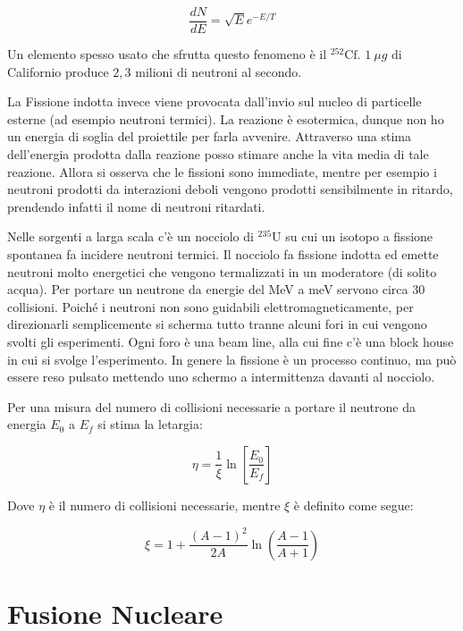 \documentclass [a4paper, twoside] {book}
\begin{document}
\begin{equation}
\frac{dN}{dE}=\sqrt{E}e^{-E/T}
\end{equation}

Un elemento spesso usato che sfrutta questo fenomeno è il $^{252}\text{Cf}$. $1 \ \mu g$ di Californio produce $2,3$ milioni di neutroni al secondo.

La Fissione indotta invece viene provocata dall'invio sul nucleo di particelle esterne (ad esempio neutroni termici). La reazione è esotermica, dunque non ho un energia di soglia del proiettile per farla avvenire. Attraverso una stima dell'energia prodotta dalla reazione posso stimare anche la vita media di tale reazione. Allora si osserva che le fissioni sono immediate, mentre per esempio i neutroni prodotti da interazioni deboli vengono prodotti sensibilmente in ritardo, prendendo infatti il nome di neutroni ritardati.

Nelle sorgenti a larga scala c'è un nocciolo di $^{235}\text{U}$ su cui un isotopo a fissione spontanea fa incidere neutroni termici. Il nocciolo fa fissione indotta ed emette neutroni molto energetici che vengono termalizzati in un moderatore (di solito acqua). Per portare un neutrone da energie del MeV a meV servono circa 30 collisioni. Poiché i neutroni non sono guidabili elettromagneticamente, per direzionarli semplicemente si scherma tutto tranne alcuni fori in cui vengono svolti gli esperimenti. Ogni foro è una beam line, alla cui fine c'è una block house in cui si svolge l'esperimento. In genere la fissione è un processo continuo, ma può essere reso pulsato mettendo uno schermo a intermittenza davanti al nocciolo.

Per una misura del numero di collisioni necessarie a portare il neutrone da energia $E_0$ a $E_f$ si stima la letargia:

\begin{equation}
\eta=\frac{1}{\xi}\ln\left[\frac{E_0}{E_f}\right]
\end{equation}

Dove $\eta$ è il numero di collisioni necessarie, mentre $\xi$ è definito come segue:

\begin{equation}
\xi=1+\frac{(A-1)^2}{2A}\ln\left(\frac{A-1}{A+1}\right)
\end{equation}

\section{Fusione Nucleare}
\end{document}
